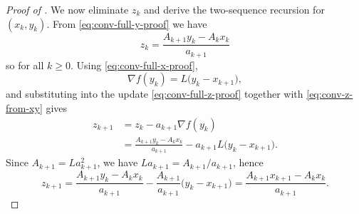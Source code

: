 \documentclass[10pt]{article}
\begin{document}
\begin{proof}[Proof of ]
We now eliminate $z_k$ and derive the two-sequence recursion for $(x_k,y_k)$.
From \eqref{eq:conv-full-y-proof} we have
\begin{equation}
z_k = \frac{A_{k+1}y_k - A_k x_k}{a_{k+1}}
\label{eq:conv-z-from-xy}
\end{equation}
so for all $k\ge 0$.
Using \eqref{eq:conv-full-x-proof},
\[
\nabla f(y_k) = L\bigl(y_k - x_{k+1}\bigr),
\]
and substituting into the update \eqref{eq:conv-full-z-proof} together with
\eqref{eq:conv-z-from-xy} gives
\begin{align*}
z_{k+1}
&= z_k - a_{k+1}\nabla f(y_k)\\
&= \frac{A_{k+1}y_k - A_k x_k}{a_{k+1}} - a_{k+1}L\bigl(y_k-x_{k+1}\bigr).
\end{align*}
Since $A_{k+1}=La_{k+1}^2$, we have $La_{k+1}=A_{k+1}/a_{k+1}$, hence
\begin{equation}
z_{k+1}
=
\frac{A_{k+1}y_k - A_k x_k}{a_{k+1}}
-
\frac{A_{k+1}}{a_{k+1}}\bigl(y_k-x_{k+1}\bigr)
=
\frac{A_{k+1}x_{k+1} - A_k x_k}{a_{k+1}}.
\label{eq:z-kplus1}
\end{equation}


\end{proof}
\end{document}
